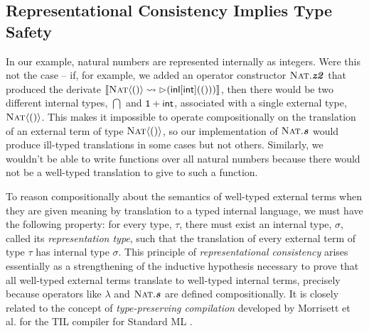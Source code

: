 \subsection{Representational Consistency Implies Type Safety}
In our example, natural numbers are represented internally as integers. Were this not the case -- if, for example, we added an operator constructor $\textsc{Nat}.\textbf{\textit{z2}}$ that produced the derivate $\llbracket \textsc{Nat}\langle()\rangle \leadsto \rhd({\sf inl}[{\sf int}](())) \rrbracket$, then there would be two different internal types, $\dint$ and $\textsf{1} + {\sf int}$,  associated with a single external type, $\textsc{Nat}\langle()\rangle$. This makes it impossible to operate compositionally on the translation of an external term of type $\textsc{Nat}\langle()\rangle$, so our implementation of $\textsc{Nat}.\textbf{\textit{s}}$ would produce ill-typed translations in some cases but not others. Similarly, we wouldn't be able to write functions over all natural numbers because there would not be a well-typed translation to give to such a function.

To reason compositionally about the semantics of well-typed external terms when they are given meaning by translation to a typed internal language, we must have the following property: for every  type, $\tau$, there must exist an internal type, $\sigma$, called its \emph{representation type}, such that the translation of every external term of type $\tau$ has internal type $\sigma$. This principle of \emph{representational consistency} arises essentially as a strengthening of the inductive hypothesis necessary to prove that all well-typed external terms translate to well-typed internal terms, precisely because operators like $\lambda$ and $\textsc{Nat}.\textbf{\textit{s}}$ are defined compositionally. It is closely related to the concept of \emph{type-preserving compilation} developed by Morrisett et al. for the TIL compiler for Standard ML \cite{TIL}. %

